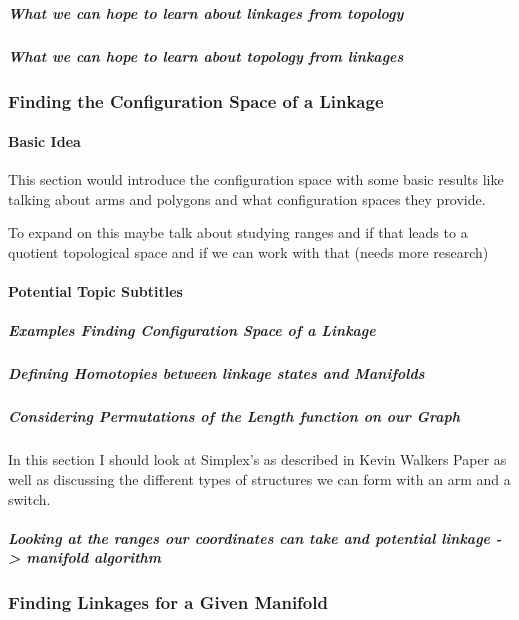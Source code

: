 \documentclass[
]{article}
\begin{document}
\hypertarget{header-n13}{%
\subparagraph{What we can hope to learn about linkages from
topology}\label{header-n13}}

\hypertarget{header-n14}{%
\subparagraph{What we can hope to learn about topology from
linkages}\label{header-n14}}

\hypertarget{header-n15}{%
\subsubsection{Finding the Configuration Space of a
Linkage}\label{header-n15}}

\hypertarget{header-n16}{%
\paragraph{Basic Idea}\label{header-n16}}

This section would introduce the configuration space with some basic
results like talking about arms and polygons and what configuration
spaces they provide.

To expand on this maybe talk about studying ranges and if that leads to
a quotient topological space and if we can work with that (needs more
research)

\hypertarget{header-n20}{%
\paragraph{Potential Topic Subtitles}\label{header-n20}}

\hypertarget{header-n21}{%
\subparagraph{Examples Finding Configuration Space of a
Linkage}\label{header-n21}}

\hypertarget{header-n22}{%
\subparagraph{Defining Homotopies between linkage states and
Manifolds}\label{header-n22}}

\hypertarget{header-n23}{%
\subparagraph{Considering Permutations of the Length function on our
Graph}\label{header-n23}}

In this section I should look at Simplex's as described in Kevin Walkers
Paper as well as discussing the different types of structures we can
form with an arm and a switch.

\hypertarget{header-n25}{%
\subparagraph{Looking at the ranges our coordinates can take and
potential linkage -\textgreater{} manifold algorithm}\label{header-n25}}

\hypertarget{header-n26}{%
\subsubsection{Finding Linkages for a Given Manifold}\label{header-n26}}
\end{document}
